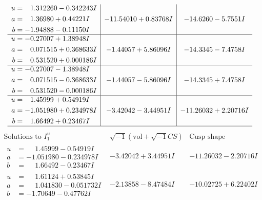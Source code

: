 \documentclass[1p]{elsarticle_modified}
\theoremstyle{definition}
\newcommand{\I}{\sqrt{-1}}
\begin{document}
$$\begin{array}{c|c|c}
\begin{aligned}
u &= \phantom{-}1.312260 - 0.342243 I \\
a &= \phantom{-}1.36980 + 0.44221 I \\
b &= -1.94888 - 0.11150 I\end{aligned}
 & -11.54010 + 0.83768 I & -14.6260 - 5.7551 I \\ \hline\begin{aligned}
u &= -0.27007 + 1.38948 I \\
a &= \phantom{-}0.071515 + 0.368633 I \\
b &= \phantom{-}0.531520 + 0.000186 I\end{aligned}
 & -1.44057 + 5.86096 I & -14.3345 - 7.4758 I \\ \hline\begin{aligned}
u &= -0.27007 - 1.38948 I \\
a &= \phantom{-}0.071515 - 0.368633 I \\
b &= \phantom{-}0.531520 - 0.000186 I\end{aligned}
 & -1.44057 - 5.86096 I & -14.3345 + 7.4758 I \\ \hline\begin{aligned}
u &= \phantom{-}1.45999 + 0.54919 I \\
a &= -1.051980 + 0.234978 I \\
b &= \phantom{-}1.66492 + 0.23467 I\end{aligned}
 & -3.42042 - 3.44951 I & -11.26032 + 2.20716 I\\
 \hline 
 \end{array}$$\newpage$$\begin{array}{c|c|c}  
\text{Solutions to }I^u_{1}& \I (\text{vol} + \sqrt{-1}CS) & \text{Cusp shape}\\
 \hline 
\begin{aligned}
u &= \phantom{-}1.45999 - 0.54919 I \\
a &= -1.051980 - 0.234978 I \\
b &= \phantom{-}1.66492 - 0.23467 I\end{aligned}
 & -3.42042 + 3.44951 I & -11.26032 - 2.20716 I \\ \hline\begin{aligned}
u &= \phantom{-}1.61124 + 0.53845 I \\
a &= \phantom{-}1.041830 - 0.051732 I \\
b &= -1.70649 - 0.47762 I\end{aligned}
 & -2.13858 - 8.47484 I & -10.02725 + 6.22402 I \\ \hline\begin{aligned}

\end{aligned}
\end{array}$$
\end{document}
